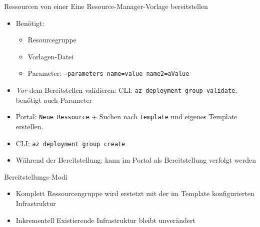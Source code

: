\begin{flashcard}[Definition]{Ressourcen von einer Eine Resource-Manager-Vorlage bereitstellen}
    \begin{itemize}
        \item Benötigt:
            \begin{itemize}
                \item Resourcegruppe
                \item Vorlagen-Datei
                \item Parameter: \texttt{--parameters name=value name2=aValue}
            \end{itemize}
        \item \emph{Vor} dem Bereitstellen validieren:\newline
            CLI: \texttt{az deployment group validate}, benötigt auch Parameter
        \item Portal: \texttt{Neue Ressource} + Suchen nach \texttt{Template} und eigenes Template erstellen.
        \item CLI: \texttt{az deployment group create}
        \item Während der Bereitstellung: kann im Portal als Bereitstellung verfolgt werden
    \end{itemize}
\end{flashcard}

\begin{flashcard}[Definition]{Bereitstellungs-Modi}
    \begin{itemize}
        \item Komplett\newline
            Ressourcengruppe wird erstetzt mit der im Template konfigurierten Infrastruktur
        \item Inkrementell\newline
            Existierende Infrastruktur bleibt unverändert
    \end{itemize}
\end{flashcard}


